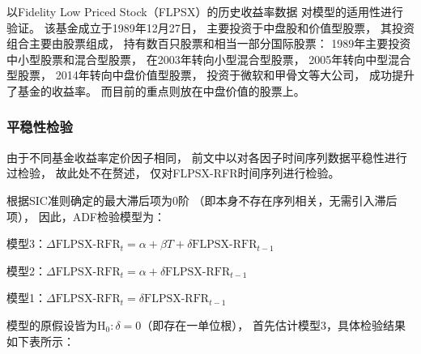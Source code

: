 \documentclass[UTF8]{ctexart}
\begin{document}
以Fidelity Low Priced Stock（FLPSX）的历史收益率数据
对模型的适用性进行验证。
该基金成立于1989年12月27日，
主要投资于中盘股和价值型股票，
其投资组合主要由股票组成，
持有数百只股票和相当一部分国际股票：
1989年主要投资中小型股票和混合型股票，
在2003年转向小型混合型股票，
2005年转向中型混合型股票，
2014年转向中盘价值型股票，
投资于微软和甲骨文等大公司，
成功提升了基金的收益率。
而目前的重点则放在中盘价值的股票上。

\subsubsection{平稳性检验}

由于不同基金收益率定价因子相同，
前文中以对各因子时间序列数据平稳性进行过检验，
故此处不在赘述，
仅对FLPSX-RFR时间序列进行检验。

根据SIC准则确定的最大滞后项为0阶
（即本身不存在序列相关，无需引入滞后项），
因此，ADF检验模型为：

模型3：$\Delta \text{FLPSX-RFR}_{t} = \alpha + \beta T +\delta \text{FLPSX-RFR}_{t-1}$

模型2：$\Delta \text{FLPSX-RFR}_{t} = \alpha + \delta  \text{FLPSX-RFR}_{t-1}$

模型1：$\Delta \text{FLPSX-RFR}_{t} = \delta \text{FLPSX-RFR}_{t-1}$


模型的原假设皆为$\text{H}_0:\delta=0$（即存在一单位根），
首先估计模型3，具体检验结果如下表所示：




\end{document}
